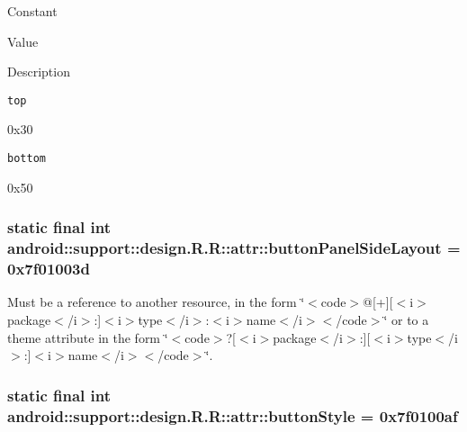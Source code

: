 Constant

Value

Description 

{\tt top}

0x30

{\tt bottom}

0x50\hypertarget{classandroid_1_1support_1_1design_1_1_r_1_1attr_886e5a76c5f7776490a0cb9c28408a72}{
\subsubsection[{buttonPanelSideLayout}]{\setlength{\rightskip}{0pt plus 5cm}static final int android::support::design.R.R::attr::buttonPanelSideLayout = 0x7f01003d}}
\label{classandroid_1_1support_1_1design_1_1_r_1_1attr_886e5a76c5f7776490a0cb9c28408a72}


Must be a reference to another resource, in the form \char`\"{}$<$code$>$@\mbox{[}+\mbox{]}\mbox{[}$<$i$>$package$<$/i$>$:\mbox{]}$<$i$>$type$<$/i$>$:$<$i$>$name$<$/i$>$$<$/code$>$\char`\"{} or to a theme attribute in the form \char`\"{}$<$code$>$?\mbox{[}$<$i$>$package$<$/i$>$:\mbox{]}\mbox{[}$<$i$>$type$<$/i$>$:\mbox{]}$<$i$>$name$<$/i$>$$<$/code$>$\char`\"{}. \hypertarget{classandroid_1_1support_1_1design_1_1_r_1_1attr_c87fce3c9cbb13140795c2bf11d739a7}{
\subsubsection[{buttonStyle}]{\setlength{\rightskip}{0pt plus 5cm}static final int android::support::design.R.R::attr::buttonStyle = 0x7f0100af}}
\label{classandroid_1_1support_1_1design_1_1_r_1_1attr_c87fce3c9cbb13140795c2bf11d739a7}


